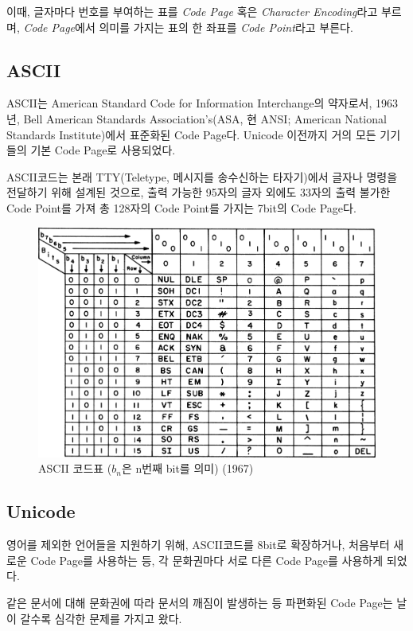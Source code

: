 \documentclass[a4paper,12pt]{book}
\begin{document}
\begin{appendices}
이때, 글자마다 번호를 부여하는 표를 \textit{Code Page} 혹은 \textit{Character Encoding}라고 부르며,
\textit{Code Page}에서 의미를 가지는 표의 한 좌표를 \textit{Code Point}라고 부른다.

\subsection{ASCII}

ASCII는 American Standard Code for Information Interchange의 약자로서,
1963년, Bell American Standards Association's(ASA, 현 ANSI; American National Standards Institute)에서 표준화된 Code Page다.
Unicode 이전까지 거의 모든 기기들의 기본 Code Page로 사용되었다.

ASCII코드는 본래 TTY(Teletype, 메시지를 송수신하는 타자기)에서 글자나 명령을 전달하기 위해 설계된 것으로,
출력 가능한 95자의 글자 외에도 33자의 출력 불가한 Code Point를 가져 총 128자의 Code Point를 가지는 7bit의 Code Page다.

\begin{figure}[!h]
    \centering
    \includegraphics[width=\linewidth]{images/us-ascii.png}
    \caption{ASCII 코드표 ($b_n$은 n번째 bit를 의미) (1967)}
\end{figure}

\subsection{Unicode}

영어를 제외한 언어들을 지원하기 위해,
ASCII코드를 8bit로 확장하거나,
처음부터 새로운 Code Page를 사용하는 등,
각 문화권마다 서로 다른 Code Page를 사용하게 되었다.

같은 문서에 대해 문화권에 따라 문서의 깨짐이 발생하는 등
파편화된 Code Page는 날이 갈수록 심각한 문제를 가지고 왔다.


\end{appendices}
\end{document}
